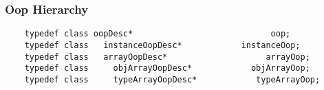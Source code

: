 \subsubsection{Oop Hierarchy}
\label{summarization:jvm:oop_hierarchy}

\begin{center}
  \begin{verbatim}
    typedef class oopDesc*                            oop;
    typedef class   instanceOopDesc*            instanceOop;
    typedef class   arrayOopDesc*                    arrayOop;
    typedef class     objArrayOopDesc*            objArrayOop;
    typedef class     typeArrayOopDesc*            typeArrayOop;
  \end{verbatim}
\end{center}
